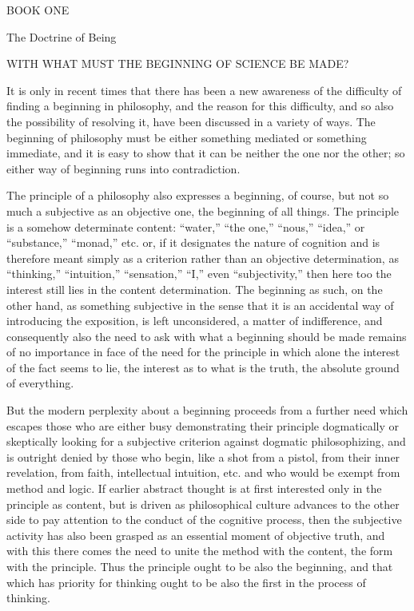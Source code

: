 BOOK ONE

The Doctrine of Being

WITH WHAT MUST THE BEGINNING OF SCIENCE BE MADE?

It is only in recent times that there has been a new awareness of
the difficulty of finding a beginning in philosophy,
and the reason for this difficulty,
and so also the possibility of resolving it,
have been discussed in a variety of ways.
The beginning of philosophy must be either
something mediated or something immediate,
and it is easy to show that it can be neither the one nor the other;
so either way of beginning runs into contradiction.

The principle of a philosophy also expresses a beginning, of course,
but not so much a subjective as an objective one,
the beginning of all things.
The principle is a somehow determinate content:
“water,” “the one,” “nous,” “idea,” or “substance,” “monad,” etc.
or, if it designates the nature of cognition
and is therefore meant simply as a criterion
rather than an objective determination,
as “thinking,” “intuition,” “sensation,” “I,” even “subjectivity,”
then here too the interest still lies in the content determination.
The beginning as such, on the other hand, as something subjective
in the sense that it is an accidental way of introducing the exposition,
is left unconsidered, a matter of indifference,
and consequently also the need to ask
with what a beginning should be made remains
of no importance in face of the need for the principle
in which alone the interest of the fact seems to lie,
the interest as to what is the truth,
the absolute ground of everything.

But the modern perplexity about a beginning proceeds from
a further need which escapes those who are either busy demonstrating
their principle dogmatically or skeptically looking for
a subjective criterion against dogmatic philosophizing,
and is outright denied by those who begin, like a shot from a pistol,
from their inner revelation, from faith, intellectual intuition, etc.
and who would be exempt from method and logic.
If earlier abstract thought is at first interested only
in the principle as content,
but is driven as philosophical culture advances
to the other side to pay attention to
the conduct of the cognitive process,
then the subjective activity has also been grasped
as an essential moment of objective truth,
and with this there comes the need to unite
the method with the content, the form with the principle.
Thus the principle ought to be also the beginning,
and that which has priority for thinking ought to be also
the first in the process of thinking.

